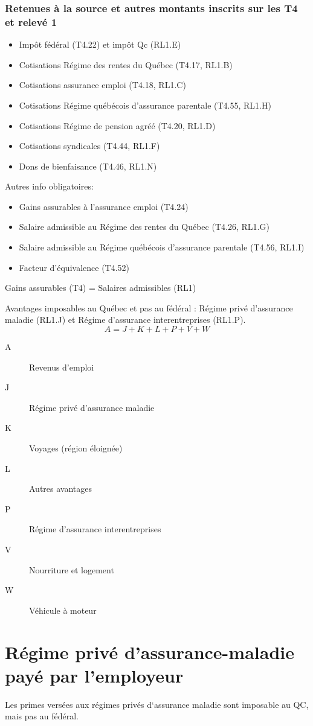 \subsubsection{Retenues à la source et autres montants inscrits sur les T4 et relevé 1}
\begin{itemize}
	\item Impôt fédéral (T4.22) et impôt Qc (RL1.E)
	\item Cotisations Régime des rentes du Québec (T4.17, RL1.B)
	\item Cotisations assurance emploi (T4.18, RL1.C)
	\item Cotisations Régime québécois d’assurance parentale (T4.55, RL1.H)
	\item Cotisations Régime de pension agréé (T4.20, RL1.D)
	\item Cotisations syndicales (T4.44, RL1.F)
	\item Dons de bienfaisance (T4.46, RL1.N)
\end{itemize}

Autres info obligatoires:
\begin{itemize}
	\item Gains assurables à l’assurance emploi (T4.24)
	\item Salaire admissible au Régime des rentes du Québec (T4.26, RL1.G)
	\item Salaire admissible au Régime québécois d’assurance parentale (T4.56, RL1.I)
	\item Facteur d’équivalence (T4.52)
\end{itemize}

Gains assurables (T4) = Salaires admissibles (RL1)

Avantages imposables au Québec et pas au fédéral : Régime privé d’assurance maladie (RL1.J) et Régime d’assurance interentreprises (RL1.P).
\[ A = J + K + L + P + V + W\]
\begin{description}
	\item[A] Revenus d’emploi
	\item[J] Régime privé d’assurance maladie 
	\item[K] Voyages (région éloignée) 
	\item[L] Autres avantages
	\item[P] Régime d’assurance interentreprises 
	\item[V] Nourriture et logement 
	\item[W] Véhicule à moteur 
\end{description}
\section{Régime privé d'assurance-maladie payé par l'employeur}
Les primes versées aux régimes privés d‘assurance maladie sont imposable au QC, mais pas au fédéral.
